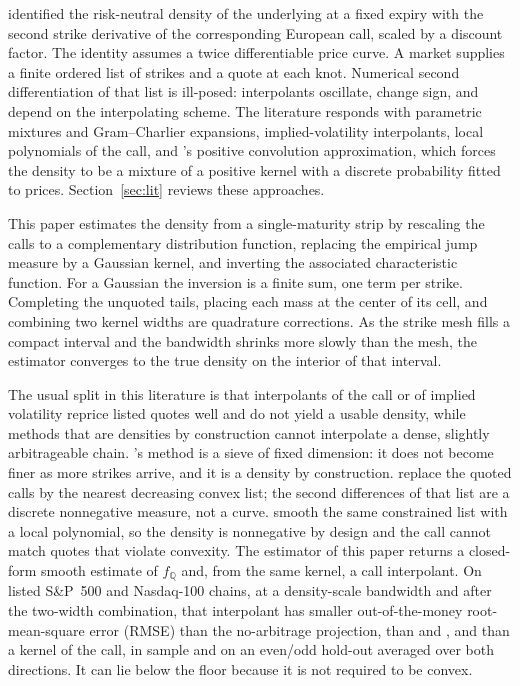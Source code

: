 \documentclass[preprint,12pt,authoryear,times]{elsarticle}
\newcommand{\Q}{\mathbb{Q}}
\begin{document}
\citet{breeden1978} identified the risk-neutral density of the underlying at a fixed expiry with the second strike derivative of the corresponding European call, scaled by a discount factor. The identity assumes a twice differentiable price curve. A market supplies a finite ordered list of strikes and a quote at each knot. Numerical second differentiation of that list is ill-posed: interpolants oscillate, change sign, and depend on the interpolating scheme. The literature responds with parametric mixtures and Gram--Charlier expansions, implied-volatility interpolants, local polynomials of the call, and \citet{bondarenko2003}'s positive convolution approximation, which forces the density to be a mixture of a positive kernel with a discrete probability fitted to prices. Section~\ref{sec:lit} reviews these approaches.

This paper estimates the density from a single-maturity strip by rescaling the calls to a complementary distribution function, replacing the empirical jump measure by a Gaussian kernel, and inverting the associated characteristic function. For a Gaussian the inversion is a finite sum, one term per strike. Completing the unquoted tails, placing each mass at the center of its cell, and combining two kernel widths are quadrature corrections. As the strike mesh fills a compact interval and the bandwidth shrinks more slowly than the mesh, the estimator converges to the true density on the interior of that interval.

The usual split in this literature is that interpolants of the call or of implied volatility reprice listed quotes well and do not yield a usable density, while methods that are densities by construction cannot interpolate a dense, slightly arbitrageable chain. \citeauthor{bondarenko2003}'s method is a sieve of fixed dimension: it does not become finer as more strikes arrive, and it is a density by construction. \citet{yatchew2006} replace the quoted calls by the nearest decreasing convex list; the second differences of that list are a discrete nonnegative measure, not a curve. \citet{aitsahalia2003} smooth the same constrained list with a local polynomial, so the density is nonnegative by design and the call cannot match quotes that violate convexity. The estimator of this paper returns a closed-form smooth estimate of \(f_{\Q}\) and, from the same kernel, a call interpolant. On listed S\&P~500 and Nasdaq-100 chains, at a density-scale bandwidth and after the two-width combination, that interpolant has smaller out-of-the-money root-mean-square error (RMSE) than the no-arbitrage projection, than \citeauthor{bondarenko2003} and \citeauthor{aitsahalia2003}, and than a \citet{priestley1972} kernel of the call, in sample and on an even/odd hold-out averaged over both directions. It can lie below the \citeauthor{yatchew2006} floor because it is not required to be convex. 
\end{document}
